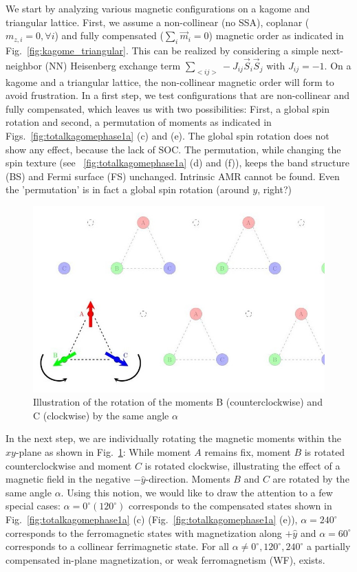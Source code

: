 \documentclass[prb,showpacs,amsmath,amssymb,superscriptaddress,twocolumn,floatfix]{revtex4-1}
\begin{document}
We start by analyzing various magnetic configurations on a kagome and triangular lattice. First, we assume a non-collinear (no SSA), coplanar ($m_{z,i} = 0, \forall i$) and fully compensated ($\sum_i \vec{m}_i = 0$) magnetic order as indicated in Fig.~\ref{fig:kagome_triangular}. This can be realized by considering a simple next-neighbor (NN) Heisenberg exchange term $\sum_{<ij>} -J_{ij} \vec{S}_i \vec{S}_j$ with $J_{ij} = -1$. On a kagome and a triangular lattice, the non-collinear magnetic order will form to avoid frustration. In a first step, we test configurations that are non-collinear and fully compensated, which leaves us with two possibilities: First, a global spin rotation and second, a permutation of moments as indicated in Figs.~\ref{fig:totalkagomephase1a} (c) and (e). The global spin rotation does not show any effect, because the lack of SOC. The permutation, while changing the spin texture (see ~\ref{fig:totalkagomephase1a} (d) and (f)), keeps the band structure (BS) and Fermi surface (FS) unchanged. Intrinsic AMR cannot be found. 
{\color{red}Even the 'permutation' is in fact a global spin rotation
  (around $y$, right?)}


\begin{figure}
	\centering
	\includegraphics[width=0.9\linewidth]{img/kagome_rotation}
	\caption{Illustration of the rotation of the moments B (counterclockwise) and C (clockwise) by the same angle $\alpha$}
	\label{fig:kagomerotation}
\end{figure}


In the next step, we are individually rotating the magnetic moments
within the $xy$-plane as shown in Fig.~\ref{fig:kagomerotation}: While moment $A$ remains fix, moment $B$ is rotated counterclockwise and moment $C$ is rotated clockwise, illustrating the effect of a magnetic field in the negative $-\hat{y}$-direction. Moments $B$ and $C$ are rotated by the same angle $\alpha$. Using this notion, we would like to draw the attention to a few special cases: $\alpha = 0^\circ (120^\circ)$ corresponds to the compensated states shown in Fig.~\ref{fig:totalkagomephase1a} (c) (Fig.~\ref{fig:totalkagomephase1a} (e)), $\alpha = 240^\circ$ corresponds to the ferromagnetic states with magnetization along $+\hat{y}$ and $\alpha = 60^\circ$ corresponds to a collinear ferrimagnetic state. For all $\alpha \neq 0^\circ, 120^\circ, 240^\circ$ a partially compensated in-plane magnetization, or weak ferromagnetism (WF), exists. 
\end{document}
